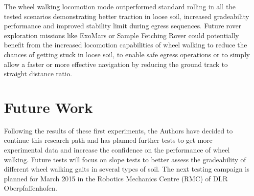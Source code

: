 \documentclass[a4paper,twocolumn]{esapub2005} %
\begin{document}
The wheel walking locomotion mode outperformed standard rolling in all the
tested scenarios demonstrating better traction in loose soil, increased
gradeability performance and improved stability limit during egress sequences.
Future rover exploration missions like ExoMars or Sample Fetching Rover could
potentially benefit from the increased locomotion capabilities of wheel walking
to reduce the chances of getting stuck in loose soil, to enable safe egress
operations or to simply allow a faster or more effective navigation by reducing
the ground track to straight distance ratio.

\section{Future Work}

Following the results of these first experiments, the Authors have decided to
continue this research path and has planned further tests to get more
experimental data and increase the confidence on the performance of wheel
walking.  Future tests will focus on slope tests to better assess the
gradeability of different wheel walking gaits in several types of soil.  The
next testing campaign is planned for March 2015 in the Robotics Mechanics
Centre (RMC) of DLR Oberpfaffenhofen.


\vspace{-3 mm}




\end{document}
